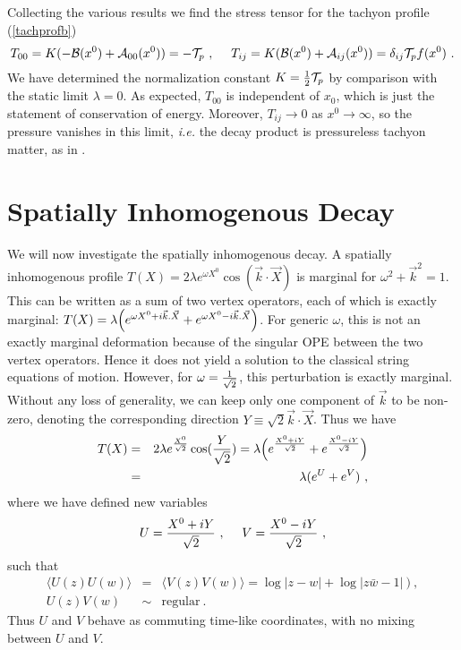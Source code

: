 \documentclass[a4paper,12pt]{article}
\begin{document}
Collecting the various results we find the stress tensor for the tachyon profile (\ref{tachprofb})
\begin{equation}
T_{00}=K(-{\cal B}(x^0)+{\cal A}_{00}(x^0))=-{\cal T}_p ~, ~~~~T_{ij}=K({\cal B}(x^0)+{\cal A}_{ij}(x^0))=\delta_{ij} {\cal T}_p f(x^0)~.
\end{equation}
We have determined the normalization constant $K={1\over 2}{\cal T}_p$ by comparison
with the static limit $\lambda=0$. 
As expected, $T_{00}$ is independent of $x_0$, which is just the statement of conservation of energy. 
Moreover, $T_{ij} \rightarrow 0$  as $x^0 \rightarrow \infty$, so the pressure vanishes in
this limit, {\it i.e.} the decay product is pressureless tachyon matter, as in \cite{Sen2}. 

\section{Spatially Inhomogenous Decay}
We will now investigate the spatially inhomogenous decay. 
 A spatially inhomogenous profile 
$T(X)=2 \lambda e^{\omega X^0} \cos(\vec{k}\cdot \vec{X})$ is marginal for 
$\omega^2+\vec{k}^2=1$. This can be written as a sum of two vertex operators, each of which is
exactly marginal:
$T(X)=\lambda \Bigl( e^{\omega X^0+i\vec{k}.\vec{X} }+e^{\omega X^0-i\vec{k}.\vec{X} } \Bigr) $.
For generic $\omega$,  this is not  an exactly marginal deformation because of the 
singular OPE between the two vertex operators. Hence it does not yield a solution to the classical string equations of motion. 
However, for $\omega={1 \over \sqrt{2}}$, this perturbation is exactly marginal. Without any 
loss of generality, we can keep only one component of $\vec{k}$ to be non-zero, denoting
the corresponding direction $Y\equiv \sqrt{2}\vec{k}\cdot\vec{X}$. Thus we have 
\begin{eqnarray}
T(X)&=&2 \lambda e^{X^0 \over \sqrt{2}} \cos({Y \over \sqrt{2}}) 
=\lambda \Bigl( e^{X^0+iY \over \sqrt{2}}+e^{X^0-iY \over \sqrt{2}} \Bigr) 
\label{spacpro} \\
& = & \lambda (e^{U}+e^V)~,
\end{eqnarray}
where we have defined new variables
\begin{equation}
U={X^0+iY \over \sqrt{2}}~,~~~~V={X^0-iY \over \sqrt{2}}~,
\end{equation}
such that
\begin{eqnarray}
\langle U(z) U(w) \rangle&=&
\langle V(z) V(w) \rangle = \log|z-w|+\log| z\bar{w} -1|~)~,\\
U(z)V(w) &\sim& \mathrm{regular} ~.
\label{ope}
\end{eqnarray}
Thus
$U$ and $V$ behave as commuting time-like coordinates, with no mixing between $U$ and $V$. 
\end{document}
